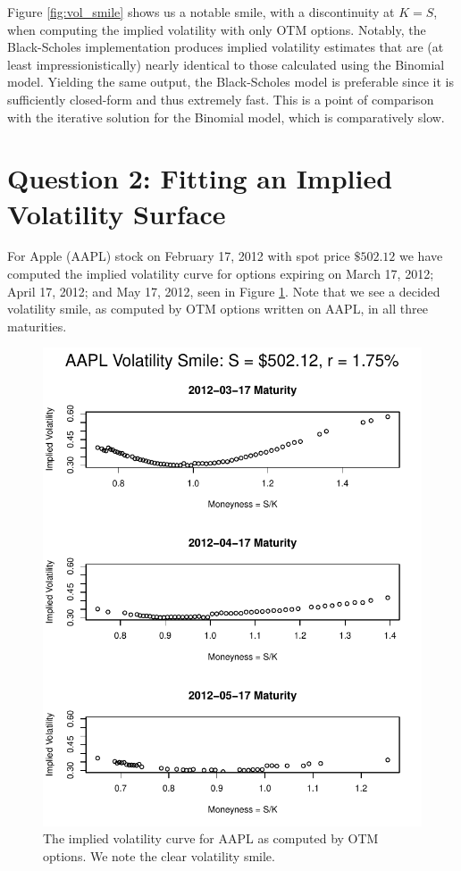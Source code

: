\documentclass[11pt]{article}
\newlength\tindent
\renewcommand{\indent}{\hspace*{\tindent}}
\begin{document}
\indent Figure \ref{fig:vol_smile} shows us a notable smile, with a discontinuity at $K = S$, when computing the implied volatility with only OTM options. Notably, the Black-Scholes implementation produces implied volatility estimates that are (at least impressionistically) nearly identical to those calculated using the Binomial model. Yielding the same output, the Black-Scholes model is preferable since it is sufficiently closed-form and thus extremely fast. This is a point of comparison with the iterative solution for the Binomial model, which is comparatively slow.

\section{Question 2: {\normalfont Fitting an Implied Volatility Surface}}

\indent For Apple (AAPL) stock on February 17, 2012 with spot price $\$502.12$ we have computed the implied volatility curve for options expiring on March 17, 2012; April 17, 2012; and May 17, 2012, seen in Figure \ref{fig:aapl_smile}. Note that we see a decided volatility smile, as computed by OTM options written on AAPL, in all three maturities.

\begin{figure}[H]
	\centering
 	\includegraphics[scale=0.85]{../plots/q2/aapl_smile.pdf}
\caption{The implied volatility curve for AAPL as computed by OTM options. We note the clear volatility smile.}
\label{fig:aapl_smile}
\end{figure}
\end{document}
